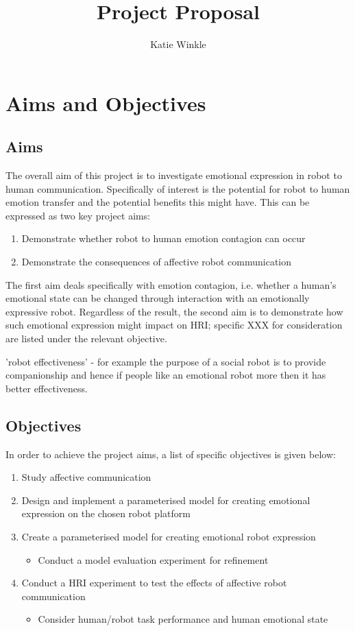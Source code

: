 \documentclass[]{article}
\title{Project Proposal}
\author{Katie Winkle}
\begin{document}
\maketitle

\begin{abstract}

\end{abstract}

\section{Aims and Objectives}
\subsection{Aims}
The overall aim of this project is to investigate emotional expression in robot to human communication. Specifically of interest is the potential for robot to human emotion transfer and the potential benefits this might have. This can be expressed as two key project aims:

\begin{enumerate}
\item Demonstrate whether robot to human emotion contagion can occur
\item Demonstrate the consequences of affective robot communication
\end{enumerate}

The first aim deals specifically with emotion contagion, i.e. whether a human's emotional state can be changed through interaction with an emotionally expressive robot. Regardless of the result, the second aim is to demonstrate how such emotional expression might impact on HRI; specific XXX for consideration are listed under the relevant objective.

'robot effectiveness' - for example the purpose of a social robot is to provide companionship and hence if people like an emotional robot more then it has better effectiveness. 

\subsection{Objectives}
In order to achieve the project aims, a list of specific objectives is given below: 
\begin{enumerate}
\item Study affective communication
\item Design and implement a parameterised model for creating emotional expression on the chosen robot platform
\item Create a parameterised model for creating emotional robot expression
\begin{itemize}
\item Conduct a model evaluation experiment for refinement
\end{itemize}
\item Conduct a HRI experiment to test the effects of affective robot communication
\begin{itemize}
\item Consider human/robot task performance and human emotional state
\end{itemize}
\end{enumerate}
\end{document}
